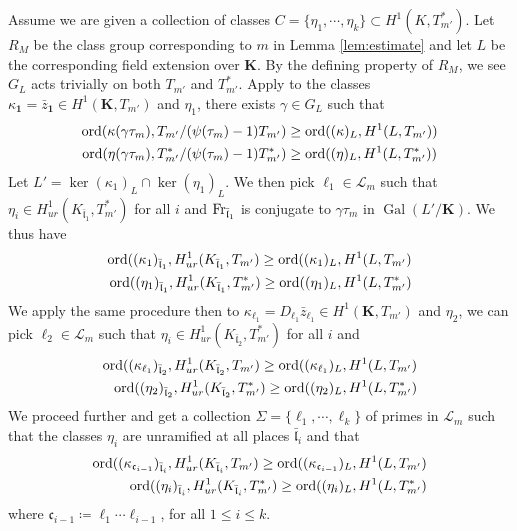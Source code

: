 \documentclass[leqno]{amsart}
\theoremstyle{definition}
\theoremstyle{remark}
\newcommand{\id}{\mathbf{1}}
\DeclareMathOperator{\Gal}{Gal}
\newcommand{\Fr}{\textnormal{Fr}} %
\newcommand{\fc}{\mathfrak{c}}
\newcommand{\fl}{\mathfrak{l}}
\newcommand{\K}{{\mathbf{K}}} %
\newcommand{\flw}{\bar{\fl}}
\newcommand{\ord}{\textnormal{ord}} %
\begin{document}
Assume we are given a collection of classes
$C=\{\eta_1,\cdots,\eta_k\}\subset H^1(K,T_{m'}^*)$.
Let $R_M$ be the class group corresponding to $m$ 
in Lemma \ref{lem:estimate}
and let $L$ be the corresponding field extension over  $\K$.
By the defining property of $R_M$,
we see  $G_L$ acts trivially on both  $T_{m'}$ and $T_{m'}^*$.
Apply \cite[Lem 5.2.1]{Rubin}
to the classes $\kappa_{\id}=\bar{z}_{\id}\in H^1(\K,T_{m'})$
and $\eta_1$, 
there exists  $\gamma\in G_L$ such that
\begin{align*}
	\ord(\kappa(\gamma\tau_m),T_{m'}/(\psi(\tau_m)-1)T_{m'})&\geq
	\ord( (\kappa)_L, H^1(L,T_{m'}) )\\
	\ord(\eta(\gamma\tau_m),T_{m'}^*/(\psi(\tau_m)-1)T_{m'}^*)&\geq
	\ord( (\eta)_L, H^1(L,T_{m'}^*) ) 
\end{align*}
Let $L'=\ker(\kappa_1)_L\cap \ker(\eta_1)_L$.
We then pick $\ell_1\in \mathcal{L}_m$ such that
$\eta_i\in H^1_{ur}(K_{\flw_1},T_{m'}^*)$ for all $i$
and $\Fr_{\flw_1}$ is conjugate to $\gamma\tau_m$ in  $\Gal(L'/\K)$.
We thus have
\begin{align*}
	\ord( (\kappa_1)_{\flw_1}, H^1_{ur}(K_{\flw_1}, T_{m'})\geq
	\ord( (\kappa_1)_{L}, H^1(L, T_{m'})\\
	\ord( (\eta_1)_{\flw_1}, H^1_{ur}(K_{\flw_1}, T_{m'}^*)\geq
	\ord( (\eta_1)_{L}, H^1(L, T_{m'}^*)
\end{align*}
We apply the same procedure then to
$\kappa_{\ell_1}=D_{\ell_1}\bar{z}_{\ell_1}\in H^1(\K,T_{m'})$
and $\eta_2$,
we can pick $\ell_2\in \mathcal{L}_m$ such that
$\eta_i\in H^1_{ur}(K_{\flw_2},T_{m'}^*)$ for all $i$ and
\begin{align*}
	\ord( (\kappa_{\ell_1})_{\flw_2}, H^1_{ur}(K_{\flw_2}, T_{m'})\geq
	\ord( (\kappa_{\ell_1})_{L}, H^1(L, T_{m'})\\
	\ord( (\eta_2)_{\flw_2}, H^1_{ur}(K_{\flw_2}, T_{m'}^*)\geq
	\ord( (\eta_2)_{L}, H^1(L, T_{m'}^*)
\end{align*}
We proceed further and get a collection 
$\Sigma=\{\ell_1,\cdots,\ell_k\}$ of primes in $\mathcal{L}_m$
such that the classes  $\eta_i$ are unramified
at all places  $\flw_i$ and that
\begin{align*}
	\ord( (\kappa_{\fc_{i-1}})_{\flw_i}, H^1_{ur}(K_{\flw_i}, T_{m'})\geq
	\ord( (\kappa_{\fc_{i-1}})_{L}, H^1(L, T_{m'})\\
	\ord( (\eta_i)_{\flw_i}, H^1_{ur}(K_{\flw_i}, T_{m'}^*)\geq
	\ord( (\eta_i)_{L}, H^1(L, T_{m'}^*)
\end{align*}
where $\fc_{i-1}\coloneqq \ell_1\cdots\ell_{i-1}$, for all $1\leq i\leq k$.
\end{document}
